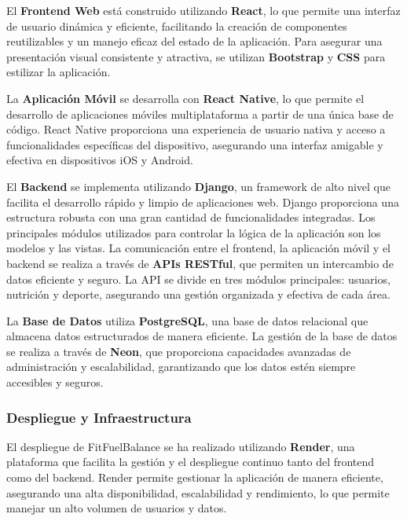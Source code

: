     El \textbf{Frontend Web} está construido utilizando \textbf{React}, lo que permite una interfaz de usuario dinámica y eficiente, facilitando la creación de componentes reutilizables y un manejo eficaz del estado de la aplicación. Para asegurar una presentación visual consistente y atractiva, se utilizan \textbf{Bootstrap} y \textbf{CSS} para estilizar la aplicación.
    
    La \textbf{Aplicación Móvil} se desarrolla con \textbf{React Native}, lo que permite el desarrollo de aplicaciones móviles multiplataforma a partir de una única base de código. React Native proporciona una experiencia de usuario nativa y acceso a funcionalidades específicas del dispositivo, asegurando una interfaz amigable y efectiva en dispositivos iOS y Android.
    
    El \textbf{Backend} se implementa utilizando \textbf{Django}, un framework de alto nivel que facilita el desarrollo rápido y limpio de aplicaciones web. Django proporciona una estructura robusta con una gran cantidad de funcionalidades integradas. Los principales módulos utilizados para controlar la lógica de la aplicación son los modelos y las vistas. La comunicación entre el frontend, la aplicación móvil y el backend se realiza a través de \textbf{APIs RESTful}, que permiten un intercambio de datos eficiente y seguro. La API se divide en tres módulos principales: usuarios, nutrición y deporte, asegurando una gestión organizada y efectiva de cada área.
    
    La \textbf{Base de Datos} utiliza \textbf{PostgreSQL}, una base de datos relacional que almacena datos estructurados de manera eficiente. La gestión de la base de datos se realiza a través de \textbf{Neon}, que proporciona capacidades avanzadas de administración y escalabilidad, garantizando que los datos estén siempre accesibles y seguros.
    

\subsubsection{Despliegue y Infraestructura}

El despliegue de FitFuelBalance se ha realizado utilizando \textbf{Render}, una plataforma que facilita la gestión y el despliegue continuo tanto del frontend como del backend. Render permite gestionar la aplicación de manera eficiente, asegurando una alta disponibilidad, escalabilidad y rendimiento, lo que permite manejar un alto volumen de usuarios y datos.
    